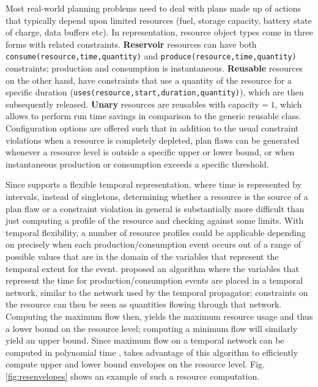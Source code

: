Most real-world planning problems need to deal with plans made up of
actions that typically depend upon limited resources (\eg fuel,
storage capacity, battery state of charge, data buffers etc).  %
In \eus representation, resource object types come in three forms with
related constraints. \textbf{Reservoir} resources can have both
\texttt{consume(resource,time,quantity)} and
\texttt{produce(resource,time,quantity)} constraints; production and
consumption is instantaneous. \textbf{Reusable} resources on the other
hand, have constraints that use a quantity of the resource for a
specific duration (\texttt{uses(resource,start,duration,quantity)}),
which are then subsequently released. \textbf {Unary} resources are
reusables with capacity$ = 1$, which allows \eu to perform run time
savings in comparison to the generic reusable class. Configuration
options are offered such that in addition to the usual constraint
violations when a resource is completely depleted, plan flaws can be
generated whenever a resource level is outside a specific upper or
lower bound, or when instantaneous production or consumption exceeds a
specific threshold.

Since \eu supports a flexible temporal representation, where time is
represented by intervals, instead of singletons, determining whether a
resource is the source of a plan flaw or a constraint violation in
general is substantially more difficult than just computing a profile
of the resource and checking against some limits.  With temporal
flexibility, a number of resource profiles could be applicable
depending on precisely when each production/consumption event occurs
out of a range of possible values that are in the domain of the
variables that represent the temporal extent for the event.
\cite{Muscettola04,Muscettola06} proposed an algorithm where the
variables that represent the time for production/consumption events
are placed in a temporal network, similar to the network used by the
temporal propagator; constraints on the resource can then be seen as
quantities flowing through that network. Computing the maximum flow
then, yields the maximum resource usage and thus a lower bound on the
resource level; computing a minimum flow will similarly yield an upper
bound. Since maximum flow on a temporal network can be computed in
polynomial time \cite{corman}, \eu takes advantage of this algorithm
to efficiently compute upper and lower bound envelopes on the resource
level. Fig. \ref{fig:resenvelopes} shows an example of such a resource
computation.

